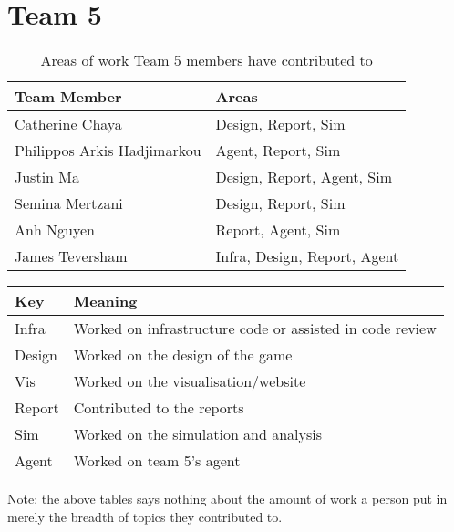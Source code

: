 \section{Team 5}
\label{sec:roles_appendix:team5}

\begin{table}[!h]
    \centering
    \begin{tabular}{|l|l|}
    \hline
    \textbf{Team Member} & \textbf{Areas}     \\ \hline
    Catherine Chaya  & Design, Report, Sim         \\
    Philippos Arkis Hadjimarkou  & Agent, Report, Sim                 \\
    Justin Ma     & Design, Report, Agent, Sim        \\
    Semina Mertzani     & Design, Report, Sim \\
    Anh Nguyen    & Report, Agent, Sim                      \\
    James Teversham  & Infra, Design, Report, Agent                        \\
\end{tabular}
\caption{Areas of work Team 5 members have contributed to}
\label{sec:roles_appendix:team5}
\end{table}

\begin{table}[!h]
    \centering
    \begin{tabular}{|l|l|}
    \hline
    \textbf{Key}    & \textbf{Meaning}                               \\ \hline
    Infra  & Worked on infrastructure code or assisted in code review \\
    Design & Worked on the design of the game                         \\
    Vis    & Worked on the visualisation/website                      \\
    Report & Contributed to the reports                               \\
    Sim    & Worked on the simulation and analysis                    \\
    Agent  & Worked on team 5's agent                                 \\ \hline
    \end{tabular}
    \end{table}

Note: the above tables says nothing about the amount of work a person put in merely the breadth of topics they contributed to.
